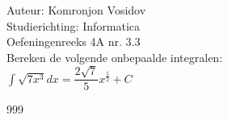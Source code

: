 \documentclass[a4paper]{article}
\newcommand{\dint}{\displaystyle\int}
\begin{document}
	
	\noindent \large Auteur: Komronjon Vosidov \\
	\noindent \large Studierichting: Informatica\\
	\noindent \large Oefeningenreeks 4A nr. 3.3\\
	
	
	\medskip
	\normalsize
	Bereken de volgende onbepaalde integralen:\\
	
	$ \dint \sqrt{7x^3} dx = \dfrac{2 \sqrt{7}}{5} x^{\tfrac{5}{2}} + C $


\begin{thebibliography}{999}
\end{thebibliography}		
\end{document}
